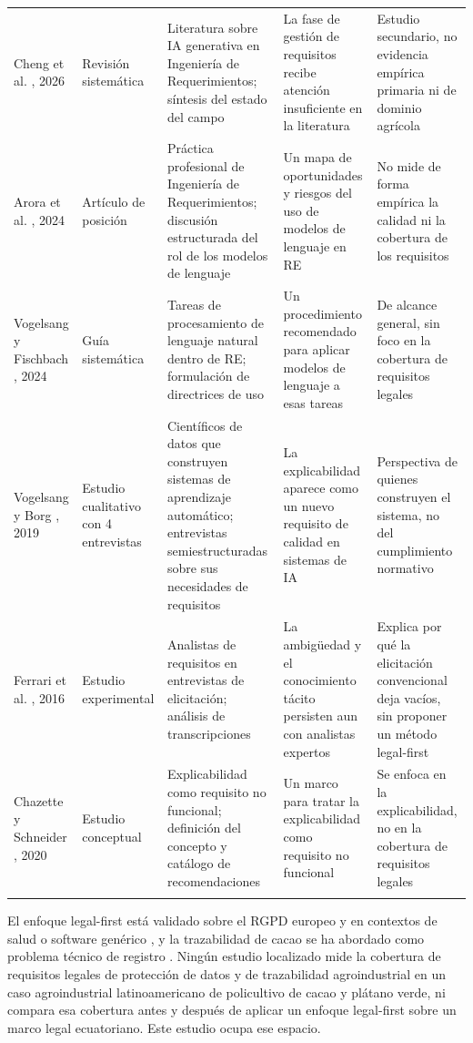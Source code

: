 \documentclass[pdflatex,sn-mathphys-num]{sn-jnl}
\begin{document}
\begin{table}[htbp]
\begin{tabular}{@{}p{2.2cm}p{1.9cm}p{2.6cm}p{2.6cm}p{3.4cm}@{}}
\addlinespace
Cheng et al. \cite{cheng2026}, 2026 & Revisi\'on sistem\'atica & Literatura sobre IA generativa en Ingenier\'ia de Requerimientos; s\'intesis del estado del campo & La fase de gesti\'on de requisitos recibe atenci\'on insuficiente en la literatura & Estudio secundario, no evidencia emp\'irica primaria ni de dominio agr\'icola \\
\addlinespace
Arora et al. \cite{arora2024}, 2024 & Art\'iculo de posici\'on & Pr\'actica profesional de Ingenier\'ia de Requerimientos; discusi\'on estructurada del rol de los modelos de lenguaje & Un mapa de oportunidades y riesgos del uso de modelos de lenguaje en RE & No mide de forma emp\'irica la calidad ni la cobertura de los requisitos \\
\addlinespace
Vogelsang y Fischbach \cite{vogelsang2024}, 2024 & Gu\'ia sistem\'atica & Tareas de procesamiento de lenguaje natural dentro de RE; formulaci\'on de directrices de uso & Un procedimiento recomendado para aplicar modelos de lenguaje a esas tareas & De alcance general, sin foco en la cobertura de requisitos legales \\
\addlinespace
Vogelsang y Borg \cite{vogelsang2019}, 2019 & Estudio cualitativo con 4 entrevistas & Cient\'ificos de datos que construyen sistemas de aprendizaje autom\'atico; entrevistas semiestructuradas sobre sus necesidades de requisitos & La explicabilidad aparece como un nuevo requisito de calidad en sistemas de IA & Perspectiva de quienes construyen el sistema, no del cumplimiento normativo \\
\addlinespace
Ferrari et al. \cite{ferrari2016}, 2016 & Estudio experimental & Analistas de requisitos en entrevistas de elicitaci\'on; an\'alisis de transcripciones & La ambig\"uedad y el conocimiento t\'acito persisten aun con analistas expertos & Explica por qu\'e la elicitaci\'on convencional deja vac\'ios, sin proponer un m\'etodo legal-first \\
\addlinespace
Chazette y Schneider \cite{chazette2020}, 2020 & Estudio conceptual & Explicabilidad como requisito no funcional; definici\'on del concepto y cat\'alogo de recomendaciones & Un marco para tratar la explicabilidad como requisito no funcional & Se enfoca en la explicabilidad, no en la cobertura de requisitos legales \\
\botrule
\end{tabular}
\end{table}

El enfoque legal-first est\'a validado sobre el RGPD europeo y en contextos de salud o software gen\'erico \cite{breaux2008,massey2010,amaral2021,torre2021,negriribalta2024}, y la trazabilidad de cacao se ha abordado como problema t\'ecnico de registro \cite{arsyad2018,marchese2022}. Ning\'un estudio localizado mide la cobertura de requisitos legales de protecci\'on de datos y de trazabilidad agroindustrial en un caso agroindustrial latinoamericano de policultivo de cacao y pl\'atano verde, ni compara esa cobertura antes y despu\'es de aplicar un enfoque legal-first sobre un marco legal ecuatoriano. Este estudio ocupa ese espacio.
\end{document}
